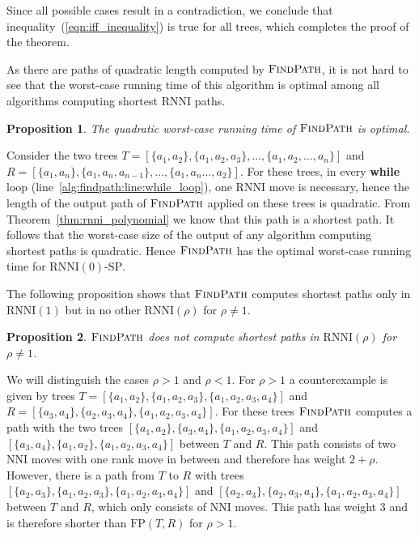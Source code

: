 \documentclass[11pt]{amsart}
\newtheorem{proposition}{Proposition}
\newcommand{\rnni}{\mathrm{RNNI}}
\newcommand{\findpath}{\textsc{FindPath}}
\newcommand{\nni}{\mathrm{NNI}}
\newcommand{\fp}{\mathrm{FP}}
\newcommand{\decprob}[1]{\rnni(#1)\text{-}\mathrm{SP}}
\begin{document}
Since all possible cases result in a contradiction, we conclude that inequality~(\ref{eqn:iff_inequality}) is true for all trees, which completes the proof of the theorem.
\endproof

As there are paths of quadratic length computed by $\findpath$, it is not hard to see that the worst-case running time of this algorithm is optimal among all algorithms computing shortest $\rnni$ paths.

\begin{proposition}
	The quadratic worst-case running time of $\findpath$ is optimal.
\end{proposition}

\proof
	Consider the two trees $T = [\{a_1,a_2\},\{a_1,a_2,a_3\},\ldots,\{a_1,a_2,\ldots,a_n\}]$ and \linebreak $R = [\{a_1,a_n\}, \{a_1,a_n,a_{n-1}\},\ldots,\{a_1,a_n\ldots,a_2\}]$.
	For these trees, in every \textbf{while} loop (line~\ref{alg:findpath:line:while_loop}), one $\rnni$ move is necessary, hence the length of the output path of $\findpath$ applied on these trees is quadratic.
	From Theorem~\ref{thm:rnni_polynomial} we know that this path is a shortest path.
	It follows that the worst-case size of the output of any algorithm computing shortest paths is quadratic.
	Hence $\findpath$ has the optimal worst-case running time for $\decprob{0}$.
\endproof

The following proposition shows that $\findpath$ computes shortest paths only in $\rnni(1)$ but in no other $\rnni(\rho)$ for $\rho \neq 1$.

\begin{proposition}
$\findpath$ does not compute shortest paths in $\rnni(\rho)$ for $\rho \neq 1$.
\label{prop:fp_only_rnni}
\end{proposition}

\proof
We will distinguish the cases $\rho > 1$ and $\rho < 1$.
For $\rho > 1$ a counterexample is given by trees $T = [\{a_1,a_2\},\{a_1,a_2,a_3\},\{a_1,a_2,a_3,a_4\}]$ and $R = [\{a_3,a_4\},\{a_2,a_3,a_4\},\{a_1,a_2,a_3,a_4\}]$.
For these trees $\findpath$ computes a path with the two trees $[\{a_1,a_2\},\{a_3,a_4\},\{a_1,a_2,a_3,a_4\}]$ and $[\{a_3,a_4\},\{a_1,a_2\},\{a_1,a_2,a_3,a_4\}]$ between $T$ and $R$.
This path consists of two $\nni$ moves with one rank move in between and therefore has weight $2 + \rho$.
However, there is a path from $T$ to $R$ with trees $[\{a_2,a_3\},\{a_1,a_2,a_3\},\{a_1,a_2,a_3,a_4\}]$ and $[\{a_2,a_3\},\{a_2,a_3,a_4\},\{a_1,a_2,a_3,a_4\}]$ between $T$ and $R$, which only consists of $\nni$ moves.
This path has weight $3$ and is therefore shorter than $\fp(T,R)$ for $\rho > 1$.
\end{document}
